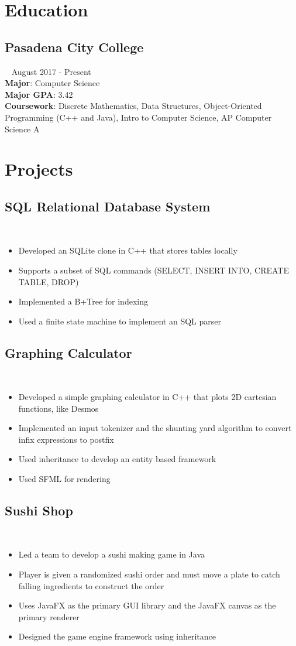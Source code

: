 \documentclass{article}
\newcommand{\resumesection}[3]{
    \subsection*{#1}
    \ 
    \footnotesize
    \textcolor{wordgrey}{#2}
    \normalsize
    \hfill
    \textcolor{wordgrey}{#3}
}
\begin{document}
\pagestyle{useheader}

\section*{Education}
\resumesection{Pasadena City College}{}{August 2017 - Present}\\
\textbf{Major}: Computer Science\\
\textbf{Major GPA}: 3.42\\
\textbf{Coursework}: Discrete Mathematics, Data Structures, Object-Oriented Programming (C++ and Java), Intro to Computer Science, AP Computer Science A
\\
\section*{Projects}
\resumesection{SQL Relational Database System}{}{}
\begin{itemize}
    \item Developed an SQLite clone in C++ that stores tables locally
    \item Supports a subset of SQL commands (SELECT, INSERT INTO, CREATE TABLE, DROP) 
    \item Implemented a B+Tree for indexing
    \item Used a finite state machine to implement an SQL parser
\end{itemize}

\resumesection{Graphing Calculator}{}{}
\begin{itemize}
    \item Developed a simple graphing calculator in C++ that plots 2D cartesian functions, like Desmos
    \item Implemented an input tokenizer and the shunting yard algorithm to convert infix expressions to postfix
    \item Used inheritance to develop an entity based framework
    \item Used SFML for rendering
\end{itemize}

\resumesection{Sushi Shop}{}{}
\begin{itemize}
    \item Led a team to develop a sushi making game in Java
    \item Player is given a randomized sushi order and must move a plate to catch falling ingredients to construct the order
    \item Uses JavaFX as the primary GUI library and the JavaFX canvas as the primary renderer 
    \item Designed the game engine framework using inheritance
\end{itemize}
\end{document}

